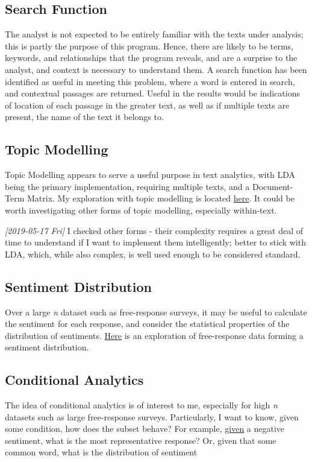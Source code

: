 \documentclass[a4paper, 11pt]{article}
\begin{document}
\subsection{Search Function}
\label{sec:org4408f61}
The analyst is not expected to be entirely familiar with the texts
under analysis; this is partly the purpose of this program. Hence,
there are likely to be terms, keywords, and relationships that the
program reveals, and are a surprise to the analyst, and context is
necessary to understand them. A search function has been identified as
useful in meeting this problem, where a word is entered in search, and
contextual passages are returned. Useful in the results would be
indications of location of each passage in the greater text, as well
as if multiple texts are present, the name of the text it belongs to.

\subsection{Topic Modelling}
\label{sec:orgba8cd61}
Topic Modelling appears to serve a useful purpose in text analytics,
with LDA being the primary implementation, requiring multiple texts,
and a Document-Term Matrix. My exploration with topic modelling is
located \href{topic-modelling.Rmd}{here}. It could be worth investigating other forms of topic
modelling, especially within-text.

\textit{[2019-05-17 Fri] } I checked other forms - their complexity requires a
great deal of time to understand if I want to implement them
intelligently; better to stick with LDA, which, while also complex, is
well used enough to be considered standard.
\subsection{Sentiment Distribution}
\label{sec:org859e0f1}
Over a large \emph{n} dataset such as free-response surveys, it may be
useful to calculate the sentiment for each response, and consider the
statistical properties of the distribution of sentiments. \href{sent-dist.org}{Here} is an
exploration of free-response data forming a sentiment distribution.
\subsection{Conditional Analytics}
\label{sec:org18d8723}
The idea of conditional analytics is of interest to me, especially for
high \emph{n} datasets such as large free-response surveys. Particularly, I
want to know, given some condition, how does the subset behave? For
example, \href{sent-dist.org}{given} a negative sentiment, what is the most representative
response? Or, given that some common word, what is the distribution of
sentiment
\end{document}
